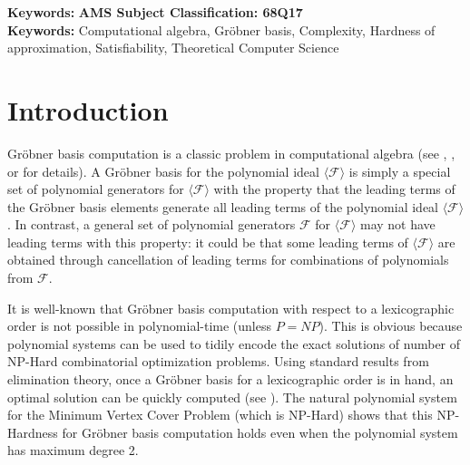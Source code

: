 \documentclass{article}
\begin{document}
\begin{abstract}
\end{abstract}

\noindent \textbf{Keywords:}
\textbf{AMS Subject Classification: 68Q17}\\
\noindent \textbf{Keywords:} Computational algebra, Gr\"{o}bner basis, Complexity, Hardness of approximation, Satisfiability, Theoretical Computer Science 


\section{Introduction}
Gr\"{o}bner basis computation is a classic problem in computational algebra (see \cite{sturmfels2005grobner}, \cite{Cox}, or \cite{Laur} for details). A Gr\"{o}bner basis for the polynomial ideal $\langle \mathcal{F}\rangle$ is simply a special set of polynomial generators for $\langle \mathcal{F}\rangle$ with the property that the leading terms of the Gr\"{o}bner basis elements generate all leading terms of the polynomial ideal $\langle \mathcal{F}\rangle$. In contrast, a general set of polynomial generators $\mathcal{F}$ for $\langle \mathcal{F}\rangle$ may not have leading terms with this property: it could be that some leading terms of $\langle \mathcal{F}\rangle$ are obtained through cancellation of leading terms for combinations of polynomials from $\mathcal{F}$.

It is well-known that Gr\"{o}bner basis computation with respect to a lexicographic order is not possible in polynomial-time (unless $P=NP$).  This is obvious because polynomial systems can be used to tidily encode the exact solutions of number of NP-Hard combinatorial optimization problems. Using standard results from elimination theory, once a Gr\"{o}bner basis for a lexicographic order is in hand, an optimal solution can be quickly computed (see \citep{Cox}). The natural polynomial system for the Minimum Vertex Cover Problem (which is NP-Hard) shows that this NP-Hardness for Gr\"{o}bner basis computation holds even when the polynomial system has maximum degree 2.
\end{document}
